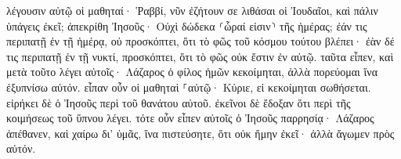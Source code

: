 \documentclass{openreader}
\begin{document}
λέγουσιν αὐτῷ οἱ μαθηταί· Ῥαββί, νῦν ἐζήτουν σε λιθάσαι οἱ Ἰουδαῖοι, καὶ πάλιν ὑπάγεις ἐκεῖ; 
ἀπεκρίθη Ἰησοῦς· Οὐχὶ δώδεκα ⸂ὧραί εἰσιν⸃ τῆς ἡμέρας; ἐάν τις περιπατῇ ἐν τῇ ἡμέρᾳ, οὐ προσκόπτει, ὅτι τὸ φῶς τοῦ κόσμου τούτου βλέπει· 
ἐὰν δέ τις περιπατῇ ἐν τῇ νυκτί, προσκόπτει, ὅτι τὸ φῶς οὐκ ἔστιν ἐν αὐτῷ. 
ταῦτα εἶπεν, καὶ μετὰ τοῦτο λέγει αὐτοῖς· Λάζαρος ὁ φίλος ἡμῶν κεκοίμηται, ἀλλὰ πορεύομαι ἵνα ἐξυπνίσω αὐτόν. 
εἶπαν οὖν οἱ μαθηταὶ ⸀αὐτῷ· Κύριε, εἰ κεκοίμηται σωθήσεται. 
εἰρήκει δὲ ὁ Ἰησοῦς περὶ τοῦ θανάτου αὐτοῦ. ἐκεῖνοι δὲ ἔδοξαν ὅτι περὶ τῆς κοιμήσεως τοῦ ὕπνου λέγει. 
τότε οὖν εἶπεν αὐτοῖς ὁ Ἰησοῦς παρρησίᾳ· Λάζαρος ἀπέθανεν, 
καὶ χαίρω δι’ ὑμᾶς, ἵνα πιστεύσητε, ὅτι οὐκ ἤμην ἐκεῖ· ἀλλὰ ἄγωμεν πρὸς αὐτόν. 
\end{document}
